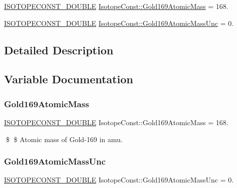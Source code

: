 \begin{DoxyCompactItemize}
\item 
\mbox{\hyperlink{group___isotope_const-_macros_ga8f45a7272ce02c0b4c65c44636ed719a}{I\+S\+O\+T\+O\+P\+E\+C\+O\+N\+S\+T\+\_\+\+D\+O\+U\+B\+LE}} \mbox{\hyperlink{group___isotope_const-_gold-_au169_ga6fab58be1a86afd9bfc998efbbf69bc5}{Isotope\+Const\+::\+Gold169\+Atomic\+Mass}} = 168.
\item 
\mbox{\hyperlink{group___isotope_const-_macros_ga8f45a7272ce02c0b4c65c44636ed719a}{I\+S\+O\+T\+O\+P\+E\+C\+O\+N\+S\+T\+\_\+\+D\+O\+U\+B\+LE}} \mbox{\hyperlink{group___isotope_const-_gold-_au169_gacea959ce52890f121ea29842e7d30e31}{Isotope\+Const\+::\+Gold169\+Atomic\+Mass\+Unc}} = 0.
\end{DoxyCompactItemize}


\subsection{Detailed Description}


\subsection{Variable Documentation}
\mbox{\label{group___isotope_const-_gold-_au169_ga6fab58be1a86afd9bfc998efbbf69bc5}} 
\subsubsection{\texorpdfstring{Gold169\+Atomic\+Mass}{Gold169AtomicMass}}
{\footnotesize\ttfamily \mbox{\hyperlink{group___isotope_const-_macros_ga8f45a7272ce02c0b4c65c44636ed719a}{I\+S\+O\+T\+O\+P\+E\+C\+O\+N\+S\+T\+\_\+\+D\+O\+U\+B\+LE}} Isotope\+Const\+::\+Gold169\+Atomic\+Mass = 168.}

\$ \$ Atomic mass of Gold-\/169 in amu. \mbox{\label{group___isotope_const-_gold-_au169_gacea959ce52890f121ea29842e7d30e31}} 
\subsubsection{\texorpdfstring{Gold169\+Atomic\+Mass\+Unc}{Gold169AtomicMassUnc}}
{\footnotesize\ttfamily \mbox{\hyperlink{group___isotope_const-_macros_ga8f45a7272ce02c0b4c65c44636ed719a}{I\+S\+O\+T\+O\+P\+E\+C\+O\+N\+S\+T\+\_\+\+D\+O\+U\+B\+LE}} Isotope\+Const\+::\+Gold169\+Atomic\+Mass\+Unc = 0.}

